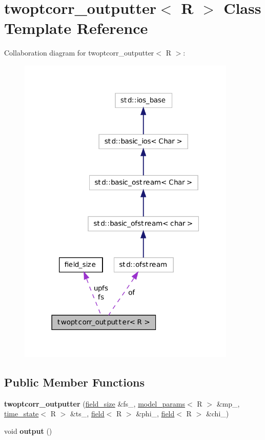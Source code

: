 \hypertarget{classtwoptcorr__outputter}{
\section{twoptcorr\_\-outputter$<$ R $>$ Class Template Reference}
\label{classtwoptcorr__outputter}
}


Collaboration diagram for twoptcorr\_\-outputter$<$ R $>$:
\nopagebreak
\begin{figure}[H]
\begin{center}
\leavevmode
\includegraphics[width=295pt]{classtwoptcorr__outputter__coll__graph}
\end{center}
\end{figure}
\subsection*{Public Member Functions}
\begin{DoxyCompactItemize}
\item 
\hypertarget{classtwoptcorr__outputter_aa12c83b128baced2f5bbd21e5399de5d}{
{\bfseries twoptcorr\_\-outputter} (\hyperlink{structfield__size}{field\_\-size} \&fs\_\-, \hyperlink{structmodel__params}{model\_\-params}$<$ R $>$ \&mp\_\-, \hyperlink{structtime__state}{time\_\-state}$<$ R $>$ \&ts\_\-, \hyperlink{classfield}{field}$<$ R $>$ \&phi\_\-, \hyperlink{classfield}{field}$<$ R $>$ \&chi\_\-)}
\label{classtwoptcorr__outputter_aa12c83b128baced2f5bbd21e5399de5d}

\item 
\hypertarget{classtwoptcorr__outputter_acd3fabba4d534ed9f028603562bc533f}{
void {\bfseries output} ()}
\label{classtwoptcorr__outputter_acd3fabba4d534ed9f028603562bc533f}

\end{DoxyCompactItemize}
